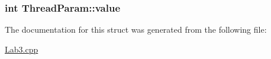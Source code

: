 \subsubsection[{\texorpdfstring{value}{value}}]{\setlength{\rightskip}{0pt plus 5cm}int Thread\+Param\+::value}\hypertarget{structThreadParam_a67d5841b5ec120d0265bc55eeb8bac6b}{}\label{structThreadParam_a67d5841b5ec120d0265bc55eeb8bac6b}


The documentation for this struct was generated from the following file\+:\begin{DoxyCompactItemize}
\item 
\hyperlink{Lab3_8cpp}{Lab3.\+cpp}\end{DoxyCompactItemize}

